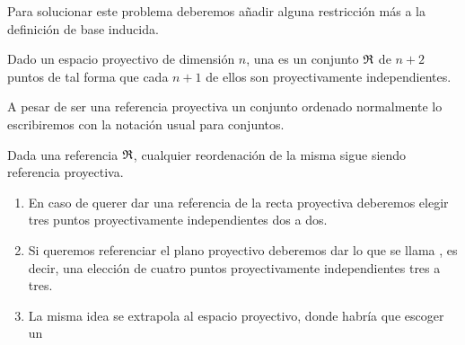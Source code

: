 Para solucionar este problema deberemos añadir alguna restricción más a la definición de base inducida.
\begin{defi}
	\label{C1_def_refereciaProyectiva}
	Dado un espacio proyectivo de dimensión $n$, una  es un conjunto  $\mathfrak{R}$ de $n+2$ puntos de tal forma que cada $n+1$ de ellos son proyectivamente independientes. 
\end{defi}

A pesar de ser una referencia proyectiva un conjunto ordenado normalmente lo escribiremos con la notación usual para conjuntos.

\begin{obs}[Reordenación]
	\label{C1_obs_reordenacionReferencias}
	Dada una referencia $\mathfrak{R}$, cualquier reordenación de la misma sigue siendo referencia proyectiva.
\end{obs} 

\begin{exa}
	\label{C1_exa_dimensionesBajas}
	\begin{enumerate}
		\item En caso de querer dar una referencia de la recta proyectiva deberemos elegir tres puntos proyectivamente independientes dos a dos.
		\item Si queremos referenciar el plano proyectivo deberemos dar lo que se llama , es decir, una elección de cuatro puntos proyectivamente independientes tres a tres.
		\item La misma idea se extrapola al espacio proyectivo, donde habría que escoger un 
	\end{enumerate}
\end{exa}
